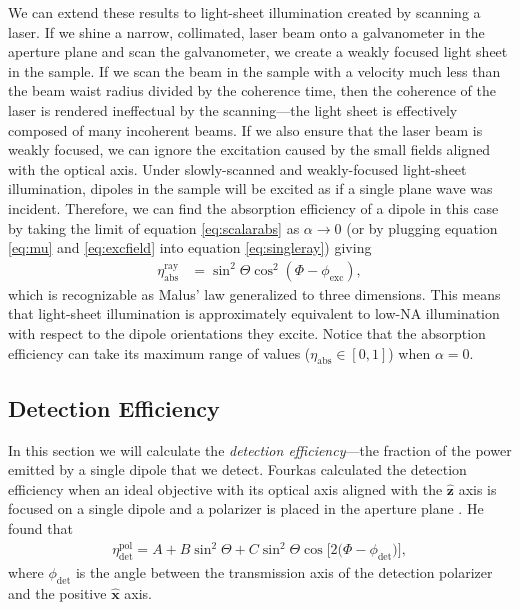 \documentclass[10pt]{article}
\providecommand{\mh}[1]{\mathbf{\hat{#1}}}
\begin{document}
We can extend these results to light-sheet illumination created by scanning a
laser. If we shine a narrow, collimated, laser beam onto a galvanometer in the
aperture plane and scan the galvanometer, we create a weakly focused light sheet
in the sample. If we scan the beam in the sample with a velocity much less than
the beam waist radius divided by the coherence time, then the coherence of the
laser is rendered ineffectual by the scanning---the light sheet is effectively
composed of many incoherent beams. If we also ensure that the laser beam is
weakly focused, we can ignore the excitation caused by the small fields aligned
with the optical axis. Under slowly-scanned and weakly-focused light-sheet
illumination, dipoles in the sample will be excited as if a single plane wave
was incident. Therefore, we can find the absorption efficiency of a dipole in
this case by taking the limit of equation \ref{eq:scalarabs} as
$\alpha \rightarrow 0$ (or by plugging equation \ref{eq:mu} and
\ref{eq:excfield} into equation \ref{eq:singleray}) giving
\begin{align}
  \eta_{\text{abs}}^{\text{ray}} &= \sin^2\Theta\cos^2(\Phi - \phi_{\text{exc}}),
\end{align}
which is recognizable as Malus' law generalized to three dimensions. This means
that light-sheet illumination is approximately equivalent to low-NA illumination
with respect to the dipole orientations they excite. Notice that the
absorption efficiency can take its maximum range of values
($\eta_{\text{abs}} \in [0, 1]$) when $\alpha=0$.

\subsection{Detection Efficiency}\label{detection}
In this section we will calculate the \emph{detection efficiency}---the fraction
of the power emitted by a single dipole that we detect. Fourkas calculated the
detection efficiency when an ideal objective with its optical axis aligned with
the $\mh{z}$ axis is focused on a single dipole and a polarizer is placed in
the aperture plane \cite{fourkas2001}. He found that
\begin{align}
  \eta_{\text{det}}^{\text{pol}} = A + B\sin^2\Theta + C\sin^{2}{\Theta} \cos{[2 (\Phi - \phi_{\text{det}}})], \label{eq:det_pol}
\end{align}
where $\phi_{\text{det}}$ is the angle between the transmission axis of the
detection polarizer and the positive $\mh{x}$ axis. 
\end{document}
